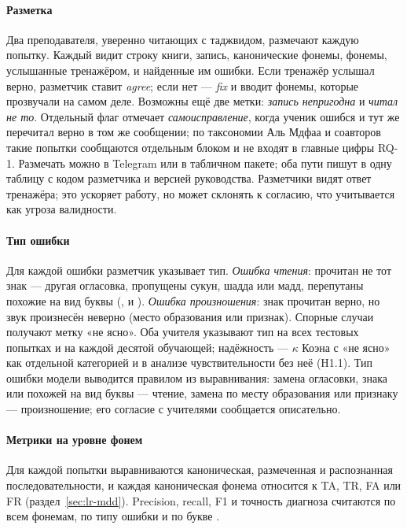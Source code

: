 \paragraph{Разметка} Два преподавателя, уверенно читающих с таджвидом, размечают каждую попытку. Каждый
видит строку книги, запись, канонические фонемы, фонемы, услышанные тренажёром, и найденные им ошибки.
Если тренажёр услышал верно, разметчик ставит \emph{agree}; если нет --- \emph{fix} и вводит фонемы, которые
прозвучали на самом деле. Возможны ещё две метки: \emph{запись непригодна} и \emph{читал не то}. Отдельный
флаг отмечает \emph{самоисправление}, когда ученик ошибся и тут же перечитал верно в том же сообщении; по
таксономии Аль Мдфаа и соавторов \cite{SRC-068} такие попытки сообщаются отдельным блоком и не входят в
главные цифры RQ-1. Размечать можно в Telegram или в табличном пакете; оба пути пишут в одну таблицу с
кодом разметчика и версией руководства. Разметчики видят ответ тренажёра; это ускоряет работу, но может
склонять к согласию, что учитывается как угроза валидности.

\paragraph{Тип ошибки} Для каждой ошибки разметчик указывает тип. \emph{Ошибка чтения}: прочитан не тот знак ---
другая огласовка, пропущены сукун, шадда или мадд, перепутаны похожие на вид буквы (,  и ).
\emph{Ошибка произношения}: знак прочитан верно, но звук произнесён неверно (место образования или признак).
Спорные случаи получают метку «не ясно». Оба учителя указывают тип на всех тестовых попытках и на каждой
десятой обучающей; надёжность --- $\kappa$ Коэна с «не ясно» как отдельной категорией и в анализе
чувствительности без неё (H1.1). Тип ошибки модели выводится правилом из выравнивания: замена огласовки, знака
или похожей на вид буквы --- чтение, замена по месту образования или признаку --- произношение; его согласие с
учителями сообщается описательно.

\paragraph{Метрики на уровне фонем} Для каждой попытки выравниваются каноническая, размеченная и
распознанная последовательности, и каждая каноническая фонема относится к TA, TR, FA или FR
(раздел~\ref{sec:lr-mdd}). Precision, recall, F1 и точность диагноза считаются по всем фонемам, по типу
ошибки и по букве \cite{SRC-064}.

